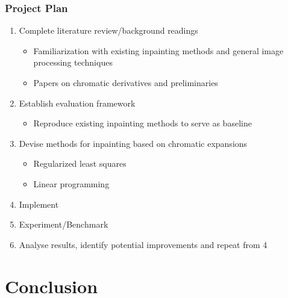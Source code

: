 \documentclass{beamer}
\begin{document}
\begin{frame}
\frametitle{Project Plan}

\begin{enumerate}
	\item Complete literature review/background readings
	\begin{itemize}
		\item Familiarization with existing inpainting methods
			and general image processing techniques
		\item Papers on chromatic derivatives and preliminaries
	\end{itemize}
	\item Establish evaluation framework
	\begin{itemize}
		\item Reproduce existing inpainting methods to serve as baseline  
	\end{itemize}
	\item Devise methods for inpainting based on chromatic expansions
	\begin{itemize}
		\item Regularized least squares 
		\item Linear programming 
	\end{itemize}
	\item Implement
	\item Experiment/Benchmark
	\item Analyse results, identify potential improvements and repeat from 4
\end{enumerate}


\end{frame}

\section{Conclusion}
\end{document}
